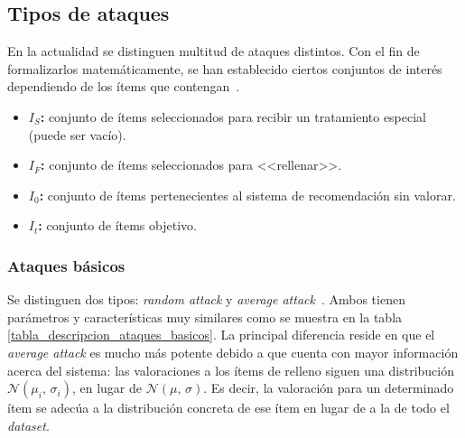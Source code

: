 \subsection{Tipos de ataques}

En la actualidad se distinguen multitud de ataques distintos. Con el fin de formalizarlos matemáticamente, se han establecido ciertos conjuntos de interés dependiendo de los ítems que contengan~\cite{zhou2021SemisupervisedRecommendationAttack}.

\begin{itemize}
	
	\item \textbf{$I_S$:} conjunto de ítems seleccionados para recibir un tratamiento especial (puede ser vacío).
	\item \textbf{$I_F$:} conjunto de ítems seleccionados para <<rellenar>>.
	\item \textbf{$I_0$:} conjunto de ítems pertenecientes al sistema de recomendación sin valorar.
	\item \textbf{$I_t$:} conjunto de ítems objetivo.
	
\end{itemize}


\subsubsection{Ataques básicos}

Se distinguen dos tipos: \textit{random attack} y \textit{average attack}~\cite{mingdan2018ShillingAttacksAReview}. Ambos tienen parámetros y características muy similares como se muestra en la tabla \ref{tabla_descripcion_ataques_basicos}. La principal diferencia reside en que el \textit{average attack} es mucho más potente debido a que cuenta con mayor información acerca del sistema: las valoraciones a los ítems de relleno siguen una distribución $\mathcal{N}(\mu_i,\,\sigma_i)$, en lugar de $\mathcal{N}(\mu,\,\sigma)$. Es decir, la valoración para un determinado ítem se adecúa a la distribución concreta de ese ítem en lugar de a la de todo el \textit{dataset}.



